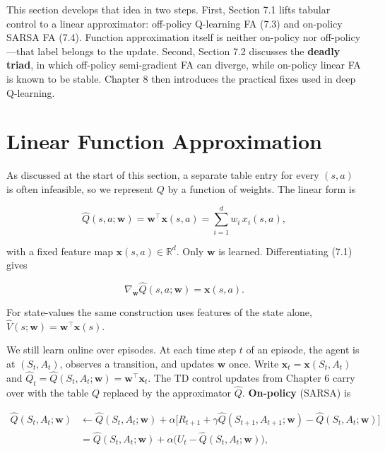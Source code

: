 This section develops that idea in two steps. First, Section 7.1 lifts tabular control to a linear approximator: off-policy Q-learning FA (7.3) and on-policy SARSA FA (7.4). Function approximation itself is neither on-policy nor off-policy---that label belongs to the update. Second, Section 7.2 discusses the \textbf{deadly triad}, in which off-policy semi-gradient FA can diverge, while on-policy linear FA is known to be stable. Chapter 8 then introduces the practical fixes used in deep Q-learning.

\section{Linear Function Approximation}

As discussed at the start of this section, a separate table entry for every $(s,a)$ is often infeasible, so we represent $Q$ by a function of weights. The linear form is

\begin{equation}
\hat{Q}(s,a;\mathbf{w})
=
\mathbf{w}^\top \mathbf{x}(s,a)
=
\sum_{i=1}^{d} w_i\, x_i(s,a),
\tag{7.1}
\end{equation}

with a fixed feature map $\mathbf{x}(s,a)\in\mathbb{R}^d$. Only $\mathbf{w}$ is learned. Differentiating (7.1) gives

\begin{equation}
\nabla_{\mathbf{w}} \hat{Q}(s,a;\mathbf{w})
=
\mathbf{x}(s,a).
\tag{7.2}
\end{equation}

For state-values the same construction uses features of the state alone, $\hat{V}(s;\mathbf{w})=\mathbf{w}^\top\mathbf{x}(s)$.

We still learn online over episodes. At each time step $t$ of an episode, the agent is at $(S_t,A_t)$, observes a transition, and updates $\mathbf{w}$ once. Write $\mathbf{x}_t=\mathbf{x}(S_t,A_t)$ and $\hat{Q}_t=\hat{Q}(S_t,A_t;\mathbf{w})=\mathbf{w}^\top\mathbf{x}_t$. The TD control updates from Chapter 6 carry over with the table $Q$ replaced by the approximator $\hat{Q}$. \textbf{On-policy} (SARSA) is

\[
\begin{aligned}
\hat{Q}(S_t,A_t;\mathbf{w})
&\leftarrow
\hat{Q}(S_t,A_t;\mathbf{w})
+
\alpha\bigl[R_{t+1}+\gamma\hat{Q}(S_{t+1},A_{t+1};\mathbf{w})-\hat{Q}(S_t,A_t;\mathbf{w})\bigr]
\\
&=
\hat{Q}(S_t,A_t;\mathbf{w})
+
\alpha\bigl(U_t-\hat{Q}(S_t,A_t;\mathbf{w})\bigr),
\end{aligned}
\]


